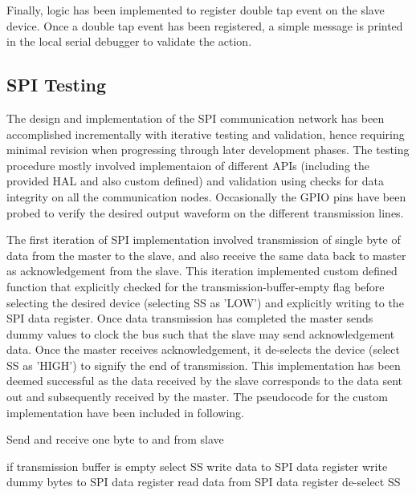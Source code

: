 Finally, logic has been implemented to register double tap event on the slave device. Once a double tap event has been registered, a simple message is printed in the local serial debugger to validate the action. 

\subsection{SPI Testing}
The design and implementation of the SPI communication network has been accomplished incrementally with iterative testing and validation, hence requiring minimal revision when progressing through later development phases. The testing procedure mostly involved implementaion of different APIs (including the provided HAL and also custom defined) and validation using checks for data integrity on all the communication nodes. Occasionally the GPIO pins have been probed to verify the desired output waveform on the different transmission lines.

The first iteration of SPI implementation involved transmission of single byte of data from the master to the slave, and also receive the same data back to master as acknowledgement from the slave. This iteration implemented custom defined function that explicitly checked for the transmission-buffer-empty flag before selecting the desired device (selecting SS as 'LOW') and explicitly writing to the SPI data register. Once data transmission has completed the master sends dummy values to clock the bus such that the slave may send acknowledgement data. Once the master receives acknowledgement, it de-selects the device (select SS as 'HIGH') to signify the end of transmission. This implementation has been deemed successful as the data received by the slave corresponds to the data sent out and subsequently received by the master. The pseudocode for the custom implementation have been included in following.

\begin{algorithm}
\caption{Send and receive one byte to and from slave}\label{alg:read-write-master}
\begin{algorithmic}[1]
\State if transmission buffer is empty
\State select SS
\State write data to SPI data register
\State write dummy bytes to SPI data register
\State read data from SPI data register
\State de-select SS
\end{algorithmic}
\end{algorithm}

